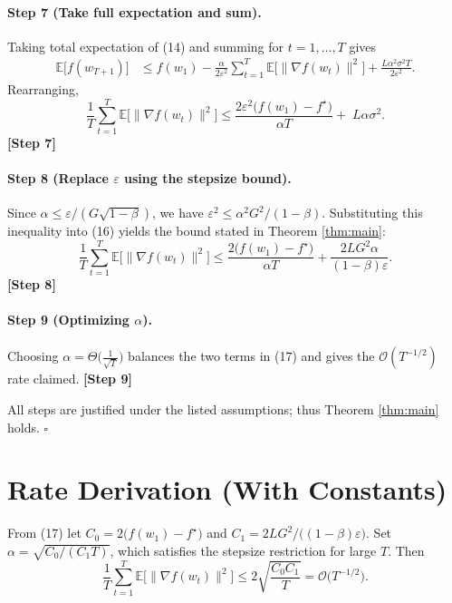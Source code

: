 \documentclass{article}
\newcommand{\E}{\mathbb{E}}
\begin{document}
\paragraph{Step 7 (Take full expectation and sum).}  
Taking total expectation of (14) and summing for $t=1,\dots,T$ gives
\[
\begin{aligned}
\E\!\big[f(w_{T+1})\big]
&\le f(w_{1})
-\frac{\alpha}{2\varepsilon^{2}}\sum_{t=1}^{T}\E\!\big[\|\nabla f(w_{t})\|^{2}\big]
+\frac{L\alpha^{2}\sigma^{2}T}{2\varepsilon^{2}} .
\end{aligned}
\tag{15}
\]
Rearranging,
\[
\frac{1}{T}\sum_{t=1}^{T}\E\!\big[\|\nabla f(w_{t})\|^{2}\big]
\le
\frac{2\varepsilon^{2}\big(f(w_{1})-f^{\star}\big)}{\alpha T}
+\;L\alpha\sigma^{2}.
\tag{16}
\]
\textbf{[Step 7]}

\paragraph{Step 8 (Replace $\varepsilon$ using the stepsize bound).}  
Since $\alpha\le\varepsilon/(G\sqrt{1-\beta})$, we have $\varepsilon^{2}\le \alpha^{2}G^{2}/(1-\beta)$.  
Substituting this inequality into (16) yields the bound stated in Theorem \ref{thm:main}:
\[
\frac{1}{T}\sum_{t=1}^{T}\E\!\big[\|\nabla f(w_{t})\|^{2}\big]
\le
\frac{2\big(f(w_{1})-f^{\star}\big)}{\alpha T}
+\frac{2LG^{2}\alpha}{(1-\beta)\varepsilon}.
\tag{17}
\]
\textbf{[Step 8]}

\paragraph{Step 9 (Optimizing $\alpha$).}  
Choosing $\alpha = \Theta\!\big(\frac{1}{\sqrt{T}}\big)$ balances the two terms in (17) and gives the $\mathcal O(T^{-1/2})$ rate claimed.  
\textbf{[Step 9]}

All steps are justified under the listed assumptions; thus Theorem \ref{thm:main} holds. \hfill $\square$

\section*{Rate Derivation (With Constants)}
From (17) let $C_{0}=2\big(f(w_{1})-f^{\star}\big)$ and $C_{1}=2LG^{2}/\big((1-\beta)\varepsilon\big)$.  
Set $\alpha = \sqrt{C_{0}/(C_{1}T)}$, which satisfies the stepsize restriction for large $T$.  
Then
\[
\frac{1}{T}\sum_{t=1}^{T}\E\!\big[\|\nabla f(w_{t})\|^{2}\big]
\le
2\sqrt{\frac{C_{0}C_{1}}{T}}
=
\mathcal O\!\big(T^{-1/2}\big).
\]
\end{document}
